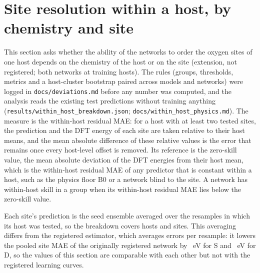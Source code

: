 \section{Site resolution within a host, by chemistry and site}
\label{si:withinhost}

This section asks whether the ability of the networks to order the oxygen sites of one host depends on the
chemistry of the host or on the site (extension, not registered; both networks at \numWithinHostBreakdownBudget{}
training hosts). The rules (groups, thresholds, metrics and a host-cluster bootstrap paired across models and networks) were logged in \texttt{docs/deviations.md}
before any number was computed, and the analysis reads the existing test predictions without training anything
(\texttt{results/within\_host\_breakdown.json}; \texttt{docs/within\_host\_physics.md}). The measure is the
within-host residual MAE: for a host with at least two tested sites, the prediction and the DFT energy of each
site are taken relative to their host means, and the mean absolute difference of these relative values is the
error that remains once every host-level offset is removed. Its reference is the zero-skill value, the mean
absolute deviation of the DFT energies from their host mean, which is the within-host residual MAE of any predictor that
is constant within a host, such as the physics floor B0 or a network blind to the site. A network has
within-host skill in a group when its within-host residual MAE lies below the zero-skill value.

Each site's prediction is the seed ensemble averaged over the resamples in which its host was tested, so the
breakdown covers \numWithinHostBreakdownGroupsPooledAllNHosts{} hosts and \numWithinHostBreakdownGroupsPooledAllNSites{}
sites. This averaging differs from the registered estimator, which averages errors per resample: it lowers the
pooled site MAE of the originally registered network by
\numWithinHostBreakdownSanityISiteMaeVOneSiteAveragedMinusRecordS{}~eV for S and
\numWithinHostBreakdownSanityISiteMaeVOneSiteAveragedMinusRecordD{}~eV for D, so the values of this section are
comparable with each other but not with the registered learning curves.

